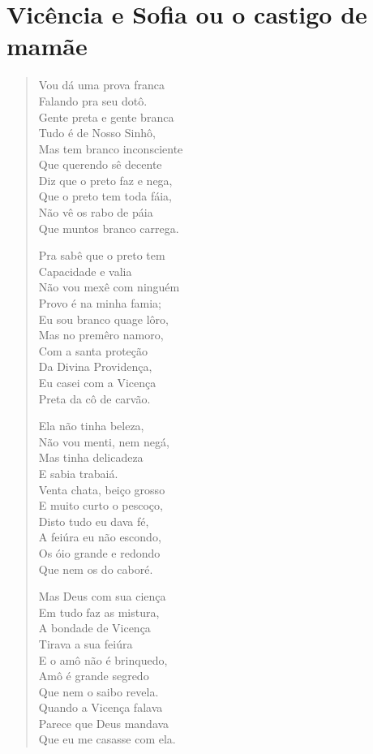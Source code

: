 \chapter{Vicência e Sofia ou o castigo de mamãe}

\begin{verse}
Vou dá uma prova franca\\
Falando pra seu dotô.\\
Gente preta e gente branca\\
Tudo é de Nosso Sinhô,\\
Mas tem branco inconsciente\\
Que querendo sê decente\\
Diz que o preto faz e nega,\\
Que o preto tem toda fáia,\\
Não vê os rabo de páia\\
Que muntos branco carrega.

Pra sabê que o preto tem\\
Capacidade e valia\\
Não vou mexê com ninguém\\
Provo é na minha famia;\\
Eu sou branco quage lôro,\\
Mas no premêro namoro,\\
Com a santa proteção\\
Da Divina Providença,\\
Eu casei com a Vicença\\
Preta da cô de carvão.

Ela não tinha beleza,\\
Não vou menti, nem negá,\\
Mas tinha delicadeza\\
E sabia trabaiá.\\
Venta chata, beiço grosso\\
E muito curto o pescoço,\\
Disto tudo eu dava fé,\\
A feiúra eu não escondo,\\
Os óio grande e redondo\\
Que nem os do caboré.

Mas Deus com sua ciença\\
Em tudo faz as mistura,\\
A bondade de Vicença\\
Tirava a sua feiúra\\
E o amô não é brinquedo,\\
Amô é grande segredo\\
Que nem o saibo revela.\\
Quando a Vicença falava\\
Parece que Deus mandava\\
Que eu me casasse com ela.


\end{verse}
